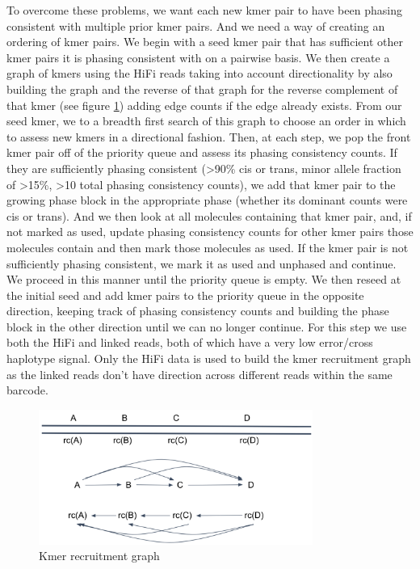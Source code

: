 {\par{
To overcome these problems, we want each new kmer pair to have been phasing consistent with multiple prior kmer pairs. And we need a way of creating an ordering of kmer pairs. We begin with a seed kmer pair that has sufficient other kmer pairs it is phasing consistent with on a pairwise basis. We then create a graph of kmers using the HiFi reads taking into account directionality by also building the graph and the reverse of that graph for the reverse complement of that kmer (see figure \ref{figure:assemblygraph}) adding edge counts if the edge already exists. From our seed kmer, we to a breadth first search of this graph to choose an order in which to assess new kmers in a directional fashion. Then, at each step, we pop the front kmer pair off of the priority queue and assess its phasing consistency counts. If they are sufficiently phasing consistent (>90\% cis or trans, minor allele fraction of >15\%, >10 total phasing consistency counts), we add that kmer pair to the growing phase block in the appropriate phase (whether its dominant counts were cis or trans). And we then look at all molecules containing that kmer pair, and, if not marked as used, update phasing consistency counts for other kmer pairs those molecules contain and then mark those molecules as used. If the kmer pair is not sufficiently phasing consistent, we mark it as used and unphased and continue. We proceed in this manner until the priority queue is empty. We then reseed at the initial seed and add kmer pairs to the priority queue in the opposite direction, keeping track of phasing consistency counts and building the phase block in the other direction until we can no longer continue. For this step we use both the HiFi and linked reads, both of which have a very low error/cross haplotype signal. Only the HiFi data is used to build the kmer recruitment graph as the linked reads don't have direction across different reads within the same barcode.
}

\begin{figure}[htbp!]
\caption{Kmer recruitment graph}
\label{figure:assemblygraph}
\begin{centering}
\includegraphics[width=0.8\textwidth]{assemblygraph.png}
\end{centering}
\end{figure}

}
